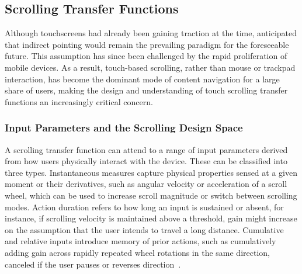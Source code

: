 \subsection{Scrolling Transfer Functions}

Although touchscreens had already been gaining traction at the time, \citeauthor{casiez2011no} anticipated that indirect pointing would remain the prevailing paradigm for the foreseeable future. This assumption has since been challenged by the rapid proliferation of mobile devices. As a result, touch-based scrolling, rather than mouse or trackpad interaction, has become the dominant mode of content navigation for a large share of users, making the design and understanding of touch scrolling transfer functions an increasingly critical concern. 

\subsubsection{Input Parameters and the Scrolling Design Space}

A scrolling transfer function can attend to a range of input parameters derived from how users physically interact with the device. These can be classified into three types. Instantaneous measures capture physical properties sensed at a given moment or their derivatives, such as angular velocity or acceleration of a scroll wheel, which can be used to increase scroll magnitude or switch between scrolling modes. Action duration refers to how long an input is sustained or absent, for instance, if scrolling velocity is maintained above a threshold, gain might increase on the assumption that the user intends to travel a long distance. Cumulative and relative inputs introduce memory of prior actions, such as cumulatively adding gain across rapidly repeated wheel rotations in the same direction, canceled if the user pauses or reverses direction~\cite{quinn2012exposing}.

